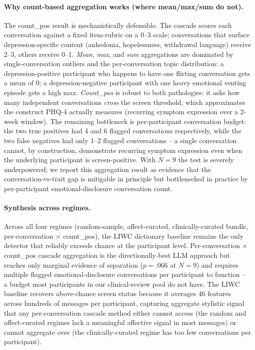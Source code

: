 \documentclass[letterpaper]{article}
\begin{document}
\paragraph{Why count-based aggregation works (where mean/max/sum do not).} The count\_pos result is mechanistically defensible. The cascade scores each conversation against a fixed item-rubric on a 0--3 scale; conversations that surface depression-specific content (anhedonia, hopelessness, withdrawal language) receive 2--3, others receive 0--1. \emph{Mean}, \emph{max}, and \emph{sum} aggregations are dominated by single-conversation outliers and the per-conversation topic distribution: a depression-positive participant who happens to have one flirting conversation gets a mean of 0; a depression-negative participant with one heavy emotional venting episode gets a high max. \emph{Count\_pos} is robust to both pathologies: it asks how many independent conversations \emph{cross} the screen threshold, which approximates the construct PHQ-4 actually measures (recurring symptom expression over a 2-week window). The remaining bottleneck is per-participant conversation budget: the two true positives had 4 and 6 flagged conversations respectively, while the two false negatives had only 1--2 flagged conversations -- a single conversation cannot, by construction, demonstrate recurring symptom expression even when the underlying participant is screen-positive. With $N=9$ the test is severely underpowered; we report this aggregation result as evidence that the conversation-vs-trait gap is mitigable in principle but bottlenecked in practice by per-participant emotional-disclosure conversation count.

\paragraph{Synthesis across regimes.} Across all four regimes (random-sample, affect-curated, clinically-curated bundle, per-conversation $\times$ count\_pos), the LIWC dictionary baseline remains the only detector that reliably exceeds chance at the participant level. Per-conversation $\times$ count\_pos cascade aggregation is the directionally-best LLM approach but reaches only marginal evidence of separation ($p=.066$ at $N=9$) and requires multiple flagged emotional-disclosure conversations per participant to function -- a budget most participants in our clinical-review pool do not have. The LIWC baseline recovers above-chance screen status because it averages 46 features across hundreds of messages per participant, capturing aggregate stylistic signal that any per-conversation cascade method either cannot access (the random and affect-curated regimes lack a meaningful affective signal in most messages) or cannot aggregate over (the clinically-curated regime has too few conversations per participant).
\end{document}
